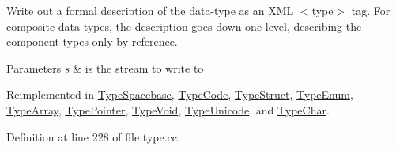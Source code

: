 Write out a formal description of the data-\/type as an X\+ML $<$type$>$ tag. For composite data-\/types, the description goes down one level, describing the component types only by reference. 
\begin{DoxyParams}{Parameters}
{\em s} & is the stream to write to \\
\hline
\end{DoxyParams}


Reimplemented in \mbox{\hyperlink{class_type_spacebase_a6540d83aa3ef2daf7bddeba9a0552c8f}{Type\+Spacebase}}, \mbox{\hyperlink{class_type_code_a6d47db2c7cf2a968b49cbac59de182d7}{Type\+Code}}, \mbox{\hyperlink{class_type_struct_a5284d41a9de3664a4e08ed8649164873}{Type\+Struct}}, \mbox{\hyperlink{class_type_enum_a2ad6a825a5a0a83687814c79ec71ebc4}{Type\+Enum}}, \mbox{\hyperlink{class_type_array_a05c4cd5b16947bdc35e53094099c44bc}{Type\+Array}}, \mbox{\hyperlink{class_type_pointer_adee39f5a617b1133d7a701cda30d154b}{Type\+Pointer}}, \mbox{\hyperlink{class_type_void_a4c29213947ce96b7899e5c8102ec54dc}{Type\+Void}}, \mbox{\hyperlink{class_type_unicode_a4dada4691cd95b817fc6a0bd99031cd6}{Type\+Unicode}}, and \mbox{\hyperlink{class_type_char_a29dadba593626c5de123934a5dcbe894}{Type\+Char}}.



Definition at line 228 of file type.\+cc.

